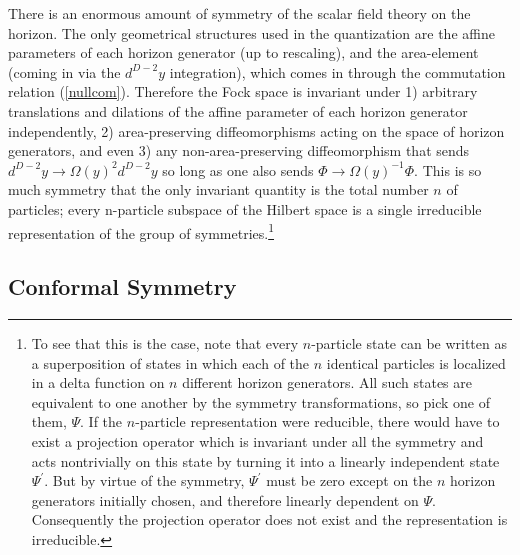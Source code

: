 \documentclass{article}
\begin{document}
There is an enormous amount of symmetry of the scalar field theory on the horizon.  The only geometrical structures used in the quantization are the affine parameters of each horizon generator (up to rescaling), and the area-element (coming in via the $d^{D-2}y$ integration), which comes in through the commutation relation (\ref{nullcom}).  Therefore the Fock space is invariant under 1) arbitrary translations and dilations of the affine parameter of each horizon generator independently, 2) area-preserving diffeomorphisms acting on the space of horizon generators, and even 3) any non-area-preserving diffeomorphism that sends $d^{D-2}y \to \Omega(y)^2 d^{D-2}y$ so long as one also sends $\Phi \to \Omega(y)^{-1} \Phi$.  This is so much symmetry that the only invariant quantity is the total number $n$ of particles; every n-particle subspace of the Hilbert space is a single irreducible representation of the group of symmetries.\footnote{To see that this is the case, note that every $n$-particle state can be written as a superposition of states in which each of the $n$ identical particles is localized in a delta function on $n$ different horizon generators.  All such states are equivalent to one another by the symmetry transformations, so pick one of them, $\Psi$.  If the $n$-particle representation were reducible, there would have to exist a projection operator which is invariant under all the symmetry and acts nontrivially on this state by turning it into a linearly independent state $\Psi^\prime$.  But by virtue of the symmetry, $\Psi^\prime$ must be zero except on the $n$ horizon generators initially chosen, and therefore linearly dependent on $\Psi$.  Consequently the projection operator does not exist and the representation is irreducible.}

\subsection{Conformal Symmetry}\label{conf}
\end{document}
